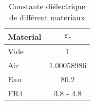 \begin{table}
    \caption{Constante diélectrique de différent materiaux}
    \begin{tabular}{l | c}
        \toprule
        Material & $\varepsilon_r$ \\
        \midrule
        \hline
        Vide & 1\\
        Air  & 1.00058986\\
        Eau  & 80.2\\
        FR4  & 3.8 - 4.8\\
        \bottomrule
    \end{tabular}
\end{table}